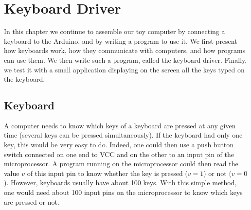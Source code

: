 
\renewcommand{\rustfile}{chapter6}
\setcounter{rustid}{0}


\chapter{Keyboard Driver}\label{chapter:keyboard}

In this chapter we continue to assemble our toy computer by connecting a
keyboard to the Arduino, and by writing a program to use it. We first present
how keyboards work, how they communicate with computers, and how programs can
use them. We then write such a program, called the keyboard driver. Finally, we
test it with a small application displaying on the screen all the keys typed on
the keyboard.

\section{Keyboard}

A computer needs to know which keys of a keyboard are pressed at any given time
(several keys can be pressed simultaneously). If the keyboard had only one key,
this would be very easy to do. Indeed, one could then use a push button switch
connected on one end to VCC and on the other to an input pin of the
microprocessor. A program running on the microprocessor could then read the
value $v$ of this input pin to know whether the key is pressed ($v=1$) or not
($v=0$). However, keyboards usually have about 100 keys. With this simple
method, one would need about 100 input pins on the microprocessor to know which
keys are pressed or not.

